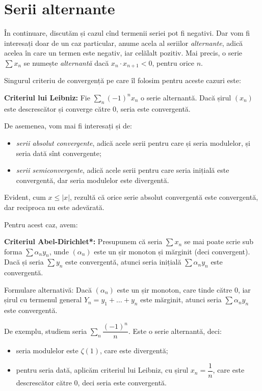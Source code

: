 \section{Serii alternante}

În continuare, discutăm și cazul cînd termenii seriei pot fi negativi. Dar
vom fi interesați doar de un caz particular, anume acela al seriilor \emph{alternante},
adică acelea în care un termen este negativ, iar celălalt pozitiv. Mai precis,
o serie $ \sum x_n $ se numește \emph{alternantă} dacă $ x_n \cdot x_{n+1} < 0 $, 
pentru orice $ n $.

Singurul criteriu de convergență pe care îl folosim pentru aceste cazuri este:

\textbf{Criteriul lui Leibniz:} Fie $ \sum_n (-1)^n x_n $ o serie
alternantă. Dacă șirul $ (x_n) $ este descrescător și converge către 0,
seria este convergentă.

De asemenea, vom mai fi interesați și de:
\begin{itemize}
    \item \emph{serii absolut convergente}, adică acele serii pentru care și
        seria modulelor, și seria dată sînt convergente;
    \item \emph{serii semiconvergente}, adică acele serii pentru care seria
        inițială este convergentă, dar seria modulelor este divergentă.
\end{itemize}

Evident, cum $ x \leq |x| $, rezultă că orice serie absolut convergentă este
convergentă, dar reciproca nu este adevărată.

Pentru acest caz, avem:

\textbf{Criteriul Abel-Dirichlet*:} Presupunem că seria $ \sum x_n $ se mai poate
scrie sub forma $ \sum \alpha_n y_n $, unde $ (\alpha_n) $ este un șir monoton
și mărginit (deci convergent). Dacă și seria $ \sum y_n $ este convergentă,
atunci seria inițială $ \sum \alpha_n y_n $ este convergentă.

Formulare alternativă: Dacă $ (\alpha_n) $ este un șir monoton, care tinde
către 0, iar șirul cu termenul general $ Y_n = y_1 + \dots + y_n $ este
mărginit, atunci seria $ \sum \alpha_n y_n $ este convergentă.

De exemplu, studiem seria $ \sum_n \dfrac{(-1)^n}{n} $. Este o serie
alternantă, deci:
\begin{itemize}
    \item seria modulelor este $ \zeta(1) $, care este divergentă;
    \item pentru seria dată, aplicăm criteriul lui Leibniz, cu șirul $ x_n = \dfrac{1}{n} $,
        care este descrescător către 0, deci seria este convergentă.
\end{itemize}

